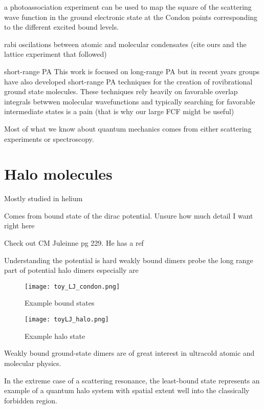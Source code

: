 a photoassociation experiment can be used to map the square of the scattering wave function in the ground electronic state at the Condon points corresponding to the different excited bound levels. \cite{Borkowski2009}


 
rabi oscilations between atomic and molecular condensates (cite ours and the lattice experiment that followed)

short-range PA
This work is focused on long-range PA but in recent years groups have also developed short-range PA techniques for the creation of rovibrational ground state molecules. These techniques rely heavily on favorable overlap integrals betwwen molecular wavefunctions and typically searching for favorable intermediate states is a pain (that is why our large FCF might be useful)


Most of what we know about quantum mechanics comes from either scattering experiments or spectroscopy.

\section{Halo molecules}
\label{sec:halo}

Mostly studied in helium

Comes from bound state of the dirac potential. Unsure how much detail I want right here

Check out CM Juleinne pg 229. He has a ref

Understanding the potential is hard
	weakly bound dimers probe the long range part of potential
	halo dimers especially are 
	
	
\begin{figure}
\label{fig:1boundstate}
	\centerline{
	\texttt{[image: toy\_LJ\_condon.png]}}
	\caption{Example bound states}{}
\end{figure} 

\begin{figure}
\label{fig:1halo}
	\centerline{
	\texttt{[image: toyLJ\_halo.png]}}
	\caption{Example halo state}{}
\end{figure} 

Weakly bound ground-state dimers are of great interest in ultracold atomic and molecular physics. 

In the extreme case of a scattering resonance, the least-bound state represents an example of a quantum halo system \cite{jrf04} with spatial extent well into the classically forbidden region. 

